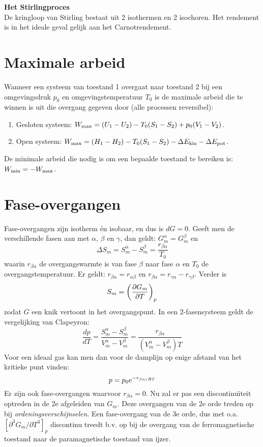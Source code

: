 {\bf Het Stirlingproces}\\[2mm]
De kringloop van Stirling bestaat uit 2 isothermen en 2 isochoren. Het
rendement is in het ideale geval gelijk aan het Carnotrendement.

\section{Maximale arbeid}
Wanneer een systeem van toestand 1 overgaat naar toestand 2 bij een
omgevingsdruk $p_0$ en omgevingstemperatuur $T_0$ is de maximale arbeid die
te winnen is uit die overgang gegeven door (alle processen reversibel):
\begin{enumerate}
\item Gesloten systeem: $W_{\rm max}=(U_1-U_2)-T_0(S_1-S_2)+p_0(V_1-V_2)$.
\item Open systeem: $W_{\rm max}=(H_1-H_2)-T_0(S_1-S_2)-\Delta E_{\rm kin}-\Delta E_{\rm pot}$.
\end{enumerate}
De minimale arbeid die nodig is om een bepaalde toestand te bereiken is:
$W_{\rm min}=-W_{\rm max}$.

\section{Fase-overgangen}
Fase-overgangen zijn isotherm \'en isobaar, en dus is $dG=0$. Geeft men de
verschillende fasen aan met $\alpha$, $\beta$ en $\gamma$, dan geldt:
$G_m^\alpha=G_m^\beta$ en
\[
\Delta S_m=S_m^\alpha - S_m^\beta=\frac{r_{\beta\alpha}}{T_0}
\]
waarin $r_{\beta\alpha}$ de overgangswarmte is van fase $\beta$ naar fase
$\alpha$ en $T_0$ de overgangstemperatuur. Er geldt:
$r_{\beta\alpha}=r_{\alpha\beta}$ en
$r_{\beta\alpha}=r_{\gamma\alpha}-r_{\gamma\beta}$.
Verder is
\[
S_m=\left(\frac{\partial G_m}{\partial T}\right)_{p}
\]
zodat $G$ een knik vertoont in het overgangspunt. In een 2-fasensysteem geldt
de vergelijking van Clapeyron:
\[
\frac{dp}{dT}=\frac{S_m^\alpha-S_m^\beta}{V_m^\alpha-V_m^\beta}=
\frac{r_{\beta\alpha}}{(V_m^\alpha-V_m^\beta)T}
\]
Voor een ideaal gas kan men dan voor de damplijn op enige afstand van het
kritieke punt vinden:
\[
p=p_0{\rm e}^{-r_{\beta\alpha/RT}}
\]
Er zijn ook fase-overgangen waarvoor $r_{\beta\alpha}=0$. Nu zal er pas een
discontinu\"{\i}teit optreden in de 2e afgeleiden van $G_m$. Deze overgangen
van de 2e orde treden op bij {\it ordeningsverschijnselen}.
\npar
Een fase-overgang van de 3e orde, dus met o.a.
$[\partial^3 G_m/\partial T^3]_p$ discontinu treedt b.v. op bij de overgang
van de ferromagnetische toestand naar de paramagnetische toestand van ijzer.

